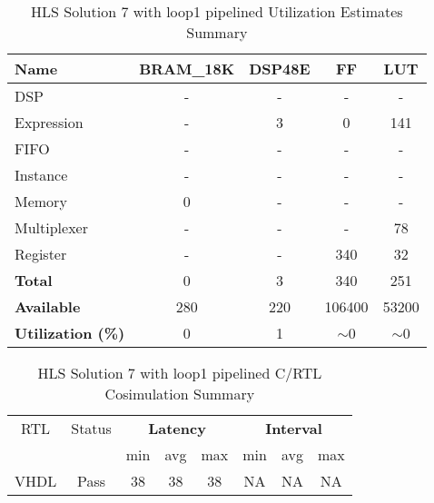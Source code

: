\begin{table}[H]
	\centering
	\begin{tabular}{|l|c|c|c|c|}
		\hline
		\textbf{Name}    & \textbf{BRAM\_18K} & \textbf{DSP48E} & \textbf{FF} & \textbf{LUT} \\ \hline
		DSP              & -                   & -               & -           & -            \\ 
		Expression       & -                   & 3              & 0           & 141          \\ 
		FIFO             & -                   & -               & -           & -            \\ 
		Instance         & -                   & -               & -           & -            \\ 
		Memory           & 0                   & -               & -          & -            \\ 
		Multiplexer      & -                   & -               & -           & 78          \\ 
		Register         & -                   & -               & 340         & 32            \\ \hline
		\textbf{Total}   & 0                   & 3               & 340         & 251          \\ \hline
		\textbf{Available} & 280               & 220             & 106400      & 53200        \\ \hline
		\textbf{Utilization (\%)} & 0            & 1               & $\sim$0     & $\sim$0      \\ \hline
	\end{tabular}
	\caption{HLS Solution 7 with loop1 pipelined Utilization Estimates Summary}
	\label{tab:hls-solution-7-loop1-pipeline-utilization-estimates-summary}
\end{table}

\begin{table}[H]
	\centering
	\begin{tabular}{|c|c|c|c|c|c|c|c|}
		\hline
		\multicolumn{1}{|c|}{RTL} & \multicolumn{1}{|c|}{Status} & \multicolumn{3}{c|}{\textbf{Latency}} & \multicolumn{3}{c|}{\textbf{Interval}} \\
		&  & min & avg & max & min & avg & max \\
		\hline
		VHDL & Pass & 38 & 38 & 38 & NA & NA & NA \\
		\hline
	\end{tabular}
	\caption{HLS Solution 7 with loop1 pipelined C/RTL Cosimulation Summary }
	\label{tab:hls-solution-7-loop1-pipeline-cosimulation-summary}
\end{table}

